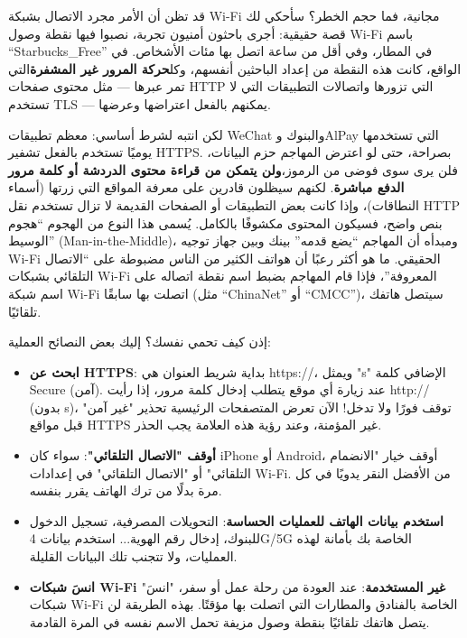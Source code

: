 قد تظن أن الأمر مجرد الاتصال بشبكة Wi-Fi مجانية، فما حجم الخطر؟ سأحكي لك قصة حقيقية: أجرى باحثون أمنيون تجربة، نصبوا فيها نقطة وصول Wi-Fi باسم “Starbucks\_Free” في المطار، وفي أقل من ساعة اتصل بها مئات الأشخاص. في الواقع، كانت هذه النقطة من إعداد الباحثين أنفسهم، وكل\textbf{حركة المرور غير المشفرة}التي تمر عبرها — مثل محتوى صفحات HTTP التي تزورها واتصالات التطبيقات التي لا تستخدم TLS — يمكنهم بالفعل اعتراضها وعرضها.

لكن انتبه لشرط أساسي: معظم تطبيقات WeChat والبنوك وAlPay التي تستخدمها يوميًا تستخدم بالفعل تشفير HTTPS. بصراحة، حتى لو اعترض المهاجم حزم البيانات، فلن يرى سوى فوضى من الرموز،\textbf{ولن يتمكن من قراءة محتوى الدردشة أو كلمة مرور الدفع مباشرة}. لكنهم سيظلون قادرين على معرفة المواقع التي زرتها (أسماء النطاقات)، وإذا كانت بعض التطبيقات أو الصفحات القديمة لا تزال تستخدم نقل HTTP بنص واضح، فسيكون المحتوى مكشوفًا بالكامل. يُسمى هذا النوع من الهجوم “هجوم الوسيط” (Man-in-the-Middle)، ومبدأه أن المهاجم “يضع قدمه” بينك وبين جهاز توجيه Wi-Fi الحقيقي. ما هو أكثر رعبًا أن هواتف الكثير من الناس مضبوطة على “الاتصال التلقائي بشبكات Wi-Fi المعروفة”، فإذا قام المهاجم بضبط اسم نقطة اتصاله على اسم شبكة Wi-Fi اتصلت بها سابقًا (مثل “ChinaNet” أو “CMCC”)، سيتصل هاتفك تلقائيًا.

إذن كيف تحمي نفسك؟ إليك بعض النصائح العملية:

\begin{itemize}
  \item \textbf{ابحث عن HTTPS}: بداية شريط العنوان هي https://، ويمثل "s" الإضافي كلمة Secure (آمن). عند زيارة أي موقع يتطلب إدخال كلمة مرور، إذا رأيت http:// (بدون s)، توقف فورًا ولا تدخل! الآن تعرض المتصفحات الرئيسية تحذير "غير آمن" قبل مواقع HTTPS غير المؤمنة، وعند رؤية هذه العلامة يجب الحذر.
  \item \textbf{أوقف "الاتصال التلقائي"}: سواء كان iPhone أو Android، أوقف خيار "الانضمام التلقائي" أو "الاتصال التلقائي" في إعدادات Wi-Fi. من الأفضل النقر يدويًا في كل مرة بدلًا من ترك الهاتف يقرر بنفسه.
  \item \textbf{استخدم بيانات الهاتف للعمليات الحساسة}: التحويلات المصرفية، تسجيل الدخول للبنوك، إدخال رقم الهوية... استخدم بيانات 4G/5G الخاصة بك بأمانة لهذه العمليات، ولا تتجنب تلك البيانات القليلة.
  \item \textbf{انسَ شبكات Wi-Fi غير المستخدمة}: عند العودة من رحلة عمل أو سفر، "انسَ" شبكات Wi-Fi الخاصة بالفنادق والمطارات التي اتصلت بها مؤقتًا. بهذه الطريقة لن يتصل هاتفك تلقائيًا بنقطة وصول مزيفة تحمل الاسم نفسه في المرة القادمة.
\end{itemize}

